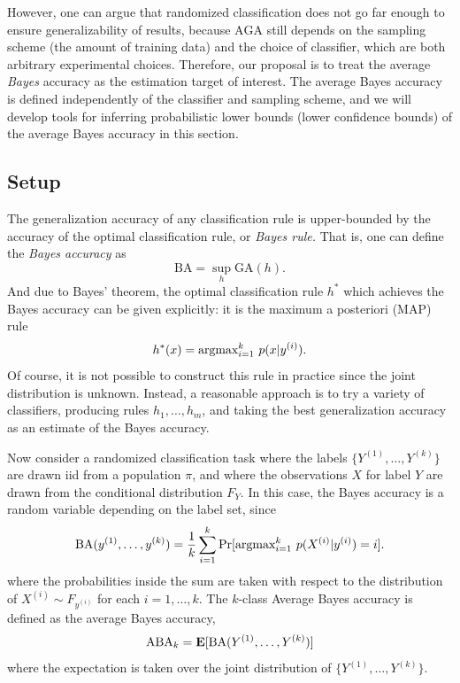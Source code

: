 However, one can argue that randomized classification does not go far
enough to ensure generalizability of results, because $\text{AGA}$
still depends on the sampling scheme (the amount of training data) and
the choice of classifier, which are both arbitrary experimental
choices.  Therefore, our proposal is to treat the average \emph{Bayes}
accuracy as the estimation target of interest.  The average Bayes
accuracy is defined independently of the classifier and sampling
scheme, and we will develop tools for inferring probabilistic lower
bounds (lower confidence bounds) of the average Bayes accuracy in this
section.

\subsection{Setup}



The generalization accuracy of any classification rule is
upper-bounded by the accuracy of the optimal classification rule, or
\emph{Bayes rule.}  That is, one can define the \emph{Bayes accuracy}
as
\[
\text{BA} = \sup_h \text{GA}(h).
\]
And due to Bayes' theorem, the optimal classification rule $h^*$ which
achieves the Bayes accuracy can be given explicitly: it is the maximum a
posteriori (MAP) rule
\[
h^*(x) = \text{argmax}_{i=1}^k\ p(x|y^{(i)}).
\]
Of course, it is not possible to construct this rule in practice since
the joint distribution is unknown.  Instead, a reasonable approach is
to try a variety of classifiers, producing rules $h_1,\hdots, h_m$,
and taking the best generalization accuracy as an estimate of the Bayes
accuracy. 

Now consider a randomized classification task where the labels
$\{Y^{(1)},\hdots, Y^{(k)}\}$ are drawn iid from a population $\pi$,
and where the observations $X$ for label $Y$ are drawn from the
conditional distribution $F_Y$.  In this case, the Bayes accuracy is a
random variable depending on the label set, since
\[
\text{BA}(y^{(1)},\hdots, y^{(k)}) = \frac{1}{k} \sum_{i=1}^k \Pr[\argmax_{i=1}^k\ p(X^{(i)}|y^{(i)}) = i].
\]
where the probabilities inside the sum are taken with respect to the distribution of $X^{(i)} \sim F_{y^{(i)}}$ for each $i = 1,\hdots, k$.
The $k$-class Average Bayes accuracy is defined as the average Bayes accuracy,
\[
\text{ABA}_k = \textbf{E}[\text{BA}(Y^{(1)},\hdots, Y^{(k)})]
\]
where the expectation is taken over the joint distribution of $\{Y^{(1)},\hdots, Y^{(k)}\}$.

